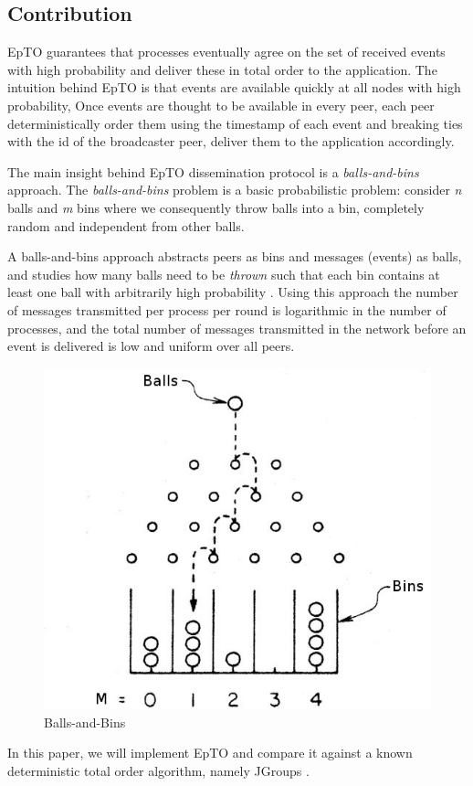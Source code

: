 \documentclass[10pt,conference,a4paper]{IEEEtran}
\begin{document}
\subsection{Contribution}
EpTO guarantees that processes eventually agree on the set of received events with high probability and deliver these in total order to the application. The intuition behind EpTO is that events are available quickly at all nodes with high probability,
Once events are thought to be available in every peer, each peer deterministically order them using the timestamp of each event and breaking ties with the id of the broadcaster peer, deliver them to the application accordingly.
\par
The main insight behind EpTO dissemination protocol is a \textit{balls-and-bins} approach. The \textit{balls-and-bins} problem is a basic probabilistic problem: consider \textit{n} balls and \textit{m} bins where we consequently throw balls into a bin, completely random and independent from other balls.
\par
A balls-and-bins approach abstracts peers as bins and messages (events) as balls, and studies how many balls need to be \textit{thrown} such that each bin contains at least one ball with arbitrarily high probability \autocite{Koldehofe02simplegossiping}. Using this approach the number of messages transmitted per process per round is logarithmic in the number of processes, and the total number of messages
transmitted in the network before an event is delivered is low and uniform over all peers.

\begin{figure}
\includegraphics[width=\linewidth]{figures/BnB.jpeg}
\caption{Balls-and-Bins}
\label{fig:balls-and-bins}
\end{figure}
\par
In this paper, we will implement EpTO and compare it against a known deterministic total order algorithm, namely JGroups \autocite{jgroups}.
\end{document}
